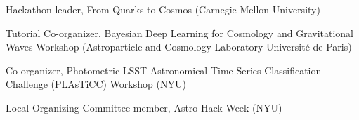 \documentclass[12pt,letterpaper]{article}
\begin{document}
%
\clearpage

\nopagebreak\begin{list}{}{\malzlist}
	\item Hackathon leader, From Quarks to Cosmos (Carnegie Mellon University) 
	\item Tutorial Co-organizer, Bayesian Deep Learning for Cosmology and Gravitational Waves Workshop (Astroparticle and Cosmology Laboratory Université de Paris) 
	\item Co-organizer, Photometric LSST Astronomical Time-Series Classification Challenge (PLAsTiCC) Workshop (NYU) 
	\item Local Organizing Committee member, Astro Hack Week (NYU) 
\end{list}
\end{document}
